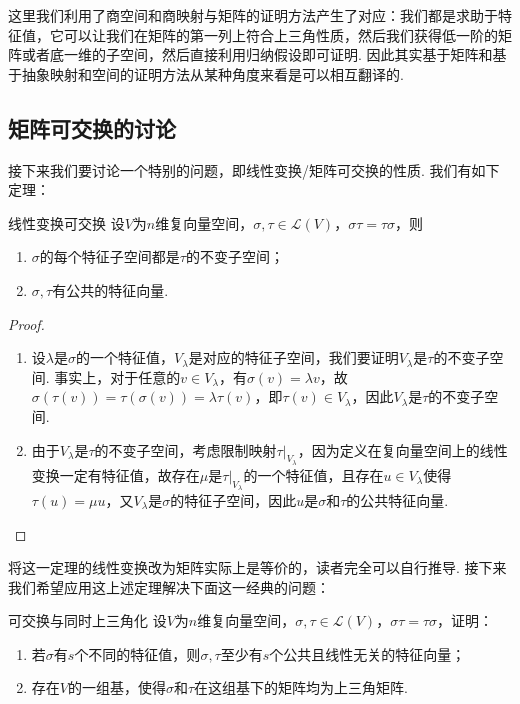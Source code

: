 这里我们利用了商空间和商映射与矩阵的证明方法产生了对应：我们都是求助于特征值，它可以让我们在矩阵的第一列上符合上三角性质，然后我们获得低一阶的矩阵或者底一维的子空间，然后直接利用归纳假设即可证明. 因此其实基于矩阵和基于抽象映射和空间的证明方法从某种角度来看是可以相互翻译的.

\subsection{矩阵可交换的讨论}
接下来我们要讨论一个特别的问题，即线性变换/矩阵可交换的性质. 我们有如下定理：
\begin{theorem}{}{线性变换可交换}
    设$V$为$n$维复向量空间，$\sigma,\tau\in \mathcal{L}(V)$，$\sigma\tau=\tau\sigma$，则
    \begin{enumerate}
        \item $\sigma$的每个特征子空间都是$\tau$的不变子空间；

        \item $\sigma,\tau$有公共的特征向量.
    \end{enumerate}
\end{theorem}
\begin{proof}
    \begin{enumerate}
        \item 设$\lambda$是$\sigma$的一个特征值，$V_\lambda$是对应的特征子空间，我们要证明$V_\lambda$是$\tau$的不变子空间. 事实上，对于任意的$v\in V_\lambda$，有$\sigma(v)=\lambda v$，故$\sigma(\tau(v))=\tau(\sigma(v))=\lambda\tau(v)$，即$\tau(v)\in V_\lambda$，因此$V_\lambda$是$\tau$的不变子空间.

        \item 由于$V_\lambda$是$\tau$的不变子空间，考虑限制映射$\tau\vert_{V_\lambda}$，因为定义在复向量空间上的线性变换一定有特征值，故存在$\mu$是$\tau\vert_{V_\lambda}$的一个特征值，且存在$u\in V_\lambda$使得$\tau(u)=\mu u$，又$V_\lambda$是$\sigma$的特征子空间，因此$u$是$\sigma$和$\tau$的公共特征向量.
    \end{enumerate}
\end{proof}

将这一定理的线性变换改为矩阵实际上是等价的，读者完全可以自行推导. 接下来我们希望应用这上述定理解决下面这一经典的问题：
\begin{example}{}{可交换与同时上三角化}
    设$V$为$n$维复向量空间，$\sigma,\tau\in \mathcal{L}(V)$，$\sigma\tau=\tau\sigma$，证明：
    \begin{enumerate}
        \item 若$\sigma$有$s$个不同的特征值，则$\sigma,\tau$至少有$s$个公共且线性无关的特征向量；

        \item 存在$V$的一组基，使得$\sigma$和$\tau$在这组基下的矩阵均为上三角矩阵.
    \end{enumerate}
\end{example}

